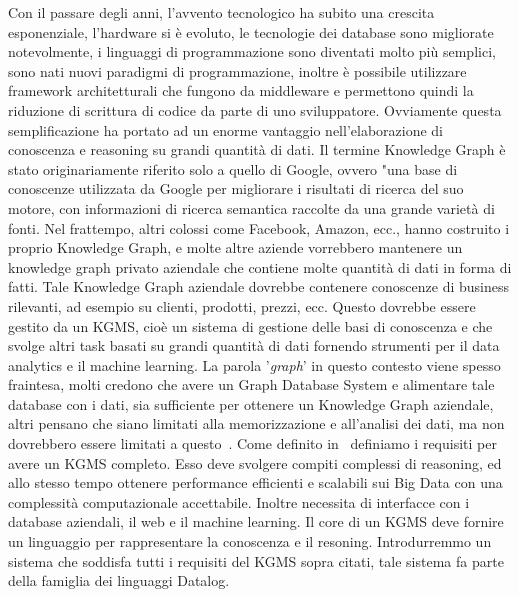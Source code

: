 Con il passare degli anni, l'avvento tecnologico ha subito una crescita esponenziale, l'hardware si è evoluto, le tecnologie dei database sono migliorate notevolmente, i linguaggi di programmazione sono diventati molto più semplici, sono nati nuovi paradigmi di programmazione, inoltre è possibile utilizzare framework architetturali che fungono da middleware e permettono quindi la riduzione di scrittura di codice da parte di uno sviluppatore. Ovviamente questa semplificazione ha portato ad un enorme vantaggio nell'elaborazione di conoscenza e reasoning su grandi quantità di dati. \newline
Il termine Knowledge Graph è stato originariamente riferito solo a quello di Google, ovvero "una base di conoscenze utilizzata da Google per migliorare i risultati di ricerca del suo motore, con informazioni di ricerca semantica raccolte da una grande varietà di fonti. Nel frattempo, altri colossi come Facebook, Amazon, ecc., hanno costruito i proprio Knowledge Graph, e molte altre aziende vorrebbero mantenere un knowledge graph privato aziendale che contiene molte quantità di dati in forma di fatti. Tale Knowledge Graph aziendale dovrebbe contenere conoscenze di business rilevanti, ad esempio su clienti, prodotti, prezzi, ecc. Questo dovrebbe essere gestito da un KGMS, cioè un sistema di gestione delle basi di conoscenza e che svolge altri task basati su grandi quantità di dati fornendo strumenti per il data analytics e il machine learning. La parola '\textit{graph}' in questo contesto viene spesso fraintesa, molti credono che avere un Graph Database System e alimentare tale database con i dati, sia sufficiente per ottenere un Knowledge Graph aziendale, altri pensano che siano limitati alla memorizzazione e all'analisi dei dati, ma non dovrebbero essere limitati a questo~\cite{bellomarini2017swift}. \newline
Come definito in~\cite{bellomarini2017swift} definiamo i requisiti per avere un KGMS completo. Esso deve svolgere compiti complessi di reasoning, ed allo stesso tempo ottenere performance efficienti e scalabili sui Big Data con una complessit\`a computazionale accettabile. Inoltre necessita di interfacce con i database aziendali, il web e il machine learning. Il core di un KGMS deve fornire un linguaggio per rappresentare la conoscenza e il resoning.\newline \newline
Introdurremmo un sistema che soddisfa tutti i requisiti del KGMS sopra citati, tale sistema fa parte della famiglia dei linguaggi Datalog. \newline
